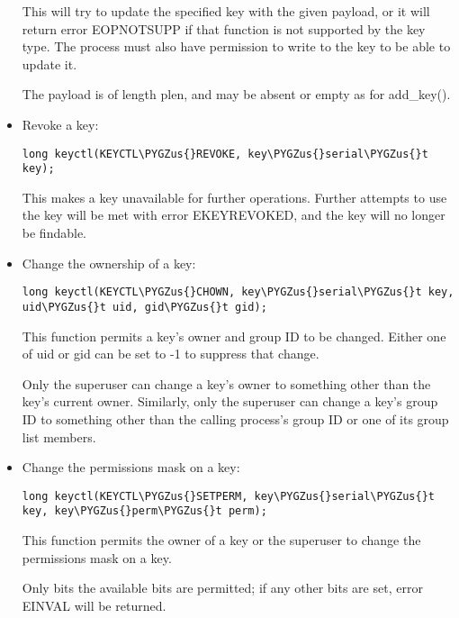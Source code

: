 \documentclass[a4paper,8pt,english]{sphinxmanual}
\def\PYGZus{\char`\_}
\begin{document}
\begin{itemize}
This will try to update the specified key with the given payload, or it
will return error EOPNOTSUPP if that function is not supported by the key
type. The process must also have permission to write to the key to be able
to update it.

The payload is of length plen, and may be absent or empty as for
add\_key().

\item {} 
Revoke a key:

\begin{Verbatim}[commandchars=\\\{\}]
long keyctl(KEYCTL\PYGZus{}REVOKE, key\PYGZus{}serial\PYGZus{}t key);
\end{Verbatim}

This makes a key unavailable for further operations. Further attempts to
use the key will be met with error EKEYREVOKED, and the key will no longer
be findable.

\item {} 
Change the ownership of a key:

\begin{Verbatim}[commandchars=\\\{\}]
long keyctl(KEYCTL\PYGZus{}CHOWN, key\PYGZus{}serial\PYGZus{}t key, uid\PYGZus{}t uid, gid\PYGZus{}t gid);
\end{Verbatim}

This function permits a key's owner and group ID to be changed. Either one
of uid or gid can be set to -1 to suppress that change.

Only the superuser can change a key's owner to something other than the
key's current owner. Similarly, only the superuser can change a key's
group ID to something other than the calling process's group ID or one of
its group list members.

\item {} 
Change the permissions mask on a key:

\begin{Verbatim}[commandchars=\\\{\}]
long keyctl(KEYCTL\PYGZus{}SETPERM, key\PYGZus{}serial\PYGZus{}t key, key\PYGZus{}perm\PYGZus{}t perm);
\end{Verbatim}

This function permits the owner of a key or the superuser to change the
permissions mask on a key.

Only bits the available bits are permitted; if any other bits are set,
error EINVAL will be returned.


\end{itemize}
\end{document}
